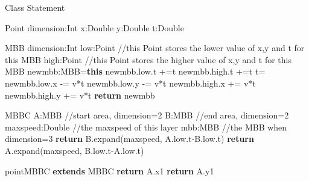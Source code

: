 \documentclass[sigplan]{acmart}
\begin{document}
\begin{algorithm}[ht]
\caption{Class Statement} \label{alg:class}



\begin{algorithmic}[ht]
\Ensure Point
    \State dimension:Int
    \State x:Double
    \State y:Double
    \State t:Double

\Ensure MBB
    \State dimension:Int
    \State low:Point //this Point stores the lower value of x,y and t for this MBB
    \State high:Point //this Point stores the higher value of x,y and t for this MBB
        \State newmbb:MBB=\textbf{this}
        \State newmbb.low.t +=t
        \State newmbb.high.t +=t
        \State t=
        \State newmbb.low.x -= v*t
        \State newmbb.low.y -= v*t
        \State newmbb.high.x += v*t
        \State newmbb.high.y += v*t
        \State \textbf{return} newmbb
    \EndFunction

\Ensure MBBC
    \State A:MBB //start area, dimension=2
    \State B:MBB //end area, dimension=2
    \State maxspeed:Double //the maxspeed of this layer
    \State mbb:MBB //the MBB when dimension=3
        \State \textbf{return} B.expand(maxspeed, A.low.t-B.low.t)
    \EndFunction
        \State \textbf{return} A.expand(maxspeed, B.low.t-A.low.t)
    \EndFunction

\Ensure pointMBBC \textbf{extends} MBBC
    \State \textbf{return} A.x1
    \EndFunction
    \State \textbf{return} A.y1
    \EndFunction
\end{algorithmic}
\end{algorithm}
\end{document}
